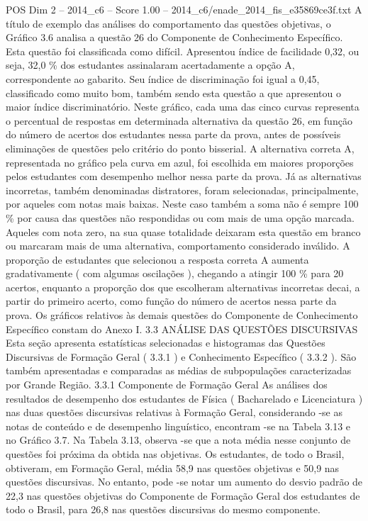 \begin{textsample}{POS Dim 2 – 2014\_c6 – Score 1.00 – 2014\_c6/enade\_2014\_fis\_e35869ce3f.txt}
A título de exemplo das análises do comportamento das questões objetivas, o Gráfico 3.6 analisa a questão 26 do Componente de Conhecimento Específico.
Esta questão foi classificada como difícil.
Apresentou índice de facilidade 0,32, ou seja, 32,0 \% dos estudantes assinalaram acertadamente a opção A, correspondente ao gabarito.
Seu índice de discriminação foi igual a 0,45, classificado como muito bom, também sendo esta questão a que apresentou o maior índice discriminatório.
Neste gráfico, cada uma das cinco curvas representa o percentual de respostas em determinada alternativa da questão 26, em função do número de acertos dos estudantes nessa parte da prova, antes de possíveis eliminações de questões pelo critério do ponto bisserial.
A alternativa correta A, representada no gráfico pela curva em azul, foi escolhida em maiores proporções pelos estudantes com desempenho melhor nessa parte da prova.
Já as alternativas incorretas, também denominadas distratores, foram selecionadas, principalmente, por aqueles com notas mais baixas.
Neste caso também a soma não é sempre 100 \% por causa das questões não respondidas ou com mais de uma opção marcada.
Aqueles com nota zero, na sua quase totalidade deixaram esta questão em branco ou marcaram mais de uma alternativa, comportamento considerado inválido.
A proporção de estudantes que selecionou a resposta correta A aumenta gradativamente ( com algumas oscilações ), chegando a atingir 100 \% para 20 acertos, enquanto a proporção dos que escolheram alternativas incorretas decai, a partir do primeiro acerto, como função do número de acertos nessa parte da prova.
Os gráficos relativos às demais questões do Componente de Conhecimento Específico constam do Anexo I. 3.3 ANÁLISE DAS QUESTÕES DISCURSIVAS Esta seção apresenta estatísticas selecionadas e histogramas das Questões Discursivas de Formação Geral ( 3.3.1 ) e Conhecimento Específico ( 3.3.2 ).
São também apresentadas e comparadas as médias de subpopulações caracterizadas por Grande Região. 3.3.1 Componente de Formação Geral As análises dos resultados de desempenho dos estudantes de Física ( Bacharelado e Licenciatura ) nas duas questões discursivas relativas à Formação Geral, considerando -se as notas de conteúdo e de desempenho linguístico, encontram -se na Tabela 3.13 e no Gráfico 3.7.
Na Tabela 3.13, observa -se que a nota média nesse conjunto de questões foi próxima da obtida nas objetivas.
Os estudantes, de todo o Brasil, obtiveram, em Formação Geral, média 58,9 nas questões objetivas e 50,9 nas questões discursivas.
No entanto, pode -se notar um aumento do desvio padrão de 22,3 nas questões objetivas do Componente de Formação Geral dos estudantes de todo o Brasil, para 26,8 nas questões discursivas do mesmo componente.

\end{textsample}
